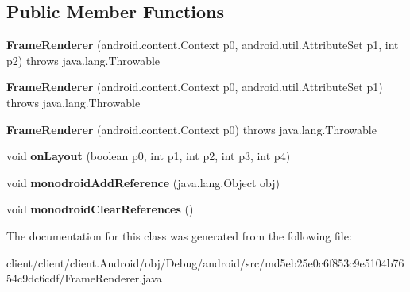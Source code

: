 \subsection*{Public Member Functions}
\begin{DoxyCompactItemize}
\item 
\hypertarget{classmd5eb25e0c6f853c9e5104b7654c9dc6cdf_1_1FrameRenderer_abe967da001973c0887e657dcf91edfbf}{}{\bfseries Frame\+Renderer} (android.\+content.\+Context p0, android.\+util.\+Attribute\+Set p1, int p2)  throws java.\+lang.\+Throwable 	\label{classmd5eb25e0c6f853c9e5104b7654c9dc6cdf_1_1FrameRenderer_abe967da001973c0887e657dcf91edfbf}

\item 
\hypertarget{classmd5eb25e0c6f853c9e5104b7654c9dc6cdf_1_1FrameRenderer_a798d7dab27a71391b3317062874a7a2d}{}{\bfseries Frame\+Renderer} (android.\+content.\+Context p0, android.\+util.\+Attribute\+Set p1)  throws java.\+lang.\+Throwable 	\label{classmd5eb25e0c6f853c9e5104b7654c9dc6cdf_1_1FrameRenderer_a798d7dab27a71391b3317062874a7a2d}

\item 
\hypertarget{classmd5eb25e0c6f853c9e5104b7654c9dc6cdf_1_1FrameRenderer_af60ce4041b2b02d7dca5c9d63c0af7e0}{}{\bfseries Frame\+Renderer} (android.\+content.\+Context p0)  throws java.\+lang.\+Throwable 	\label{classmd5eb25e0c6f853c9e5104b7654c9dc6cdf_1_1FrameRenderer_af60ce4041b2b02d7dca5c9d63c0af7e0}

\item 
\hypertarget{classmd5eb25e0c6f853c9e5104b7654c9dc6cdf_1_1FrameRenderer_affbda8d146aac401ae7be3d52ae42f5b}{}void {\bfseries on\+Layout} (boolean p0, int p1, int p2, int p3, int p4)\label{classmd5eb25e0c6f853c9e5104b7654c9dc6cdf_1_1FrameRenderer_affbda8d146aac401ae7be3d52ae42f5b}

\item 
\hypertarget{classmd5eb25e0c6f853c9e5104b7654c9dc6cdf_1_1FrameRenderer_af191eea6109033317d5b798c4f73e54c}{}void {\bfseries monodroid\+Add\+Reference} (java.\+lang.\+Object obj)\label{classmd5eb25e0c6f853c9e5104b7654c9dc6cdf_1_1FrameRenderer_af191eea6109033317d5b798c4f73e54c}

\item 
\hypertarget{classmd5eb25e0c6f853c9e5104b7654c9dc6cdf_1_1FrameRenderer_abc303d930ca94489191099a1ebaba274}{}void {\bfseries monodroid\+Clear\+References} ()\label{classmd5eb25e0c6f853c9e5104b7654c9dc6cdf_1_1FrameRenderer_abc303d930ca94489191099a1ebaba274}

\end{DoxyCompactItemize}


The documentation for this class was generated from the following file\+:\begin{DoxyCompactItemize}
\item 
client/client/client.\+Android/obj/\+Debug/android/src/md5eb25e0c6f853c9e5104b7654c9dc6cdf/Frame\+Renderer.\+java\end{DoxyCompactItemize}
